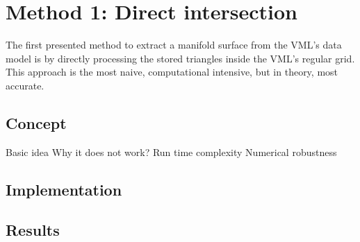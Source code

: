 
\chapter{Method 1: Direct intersection}
\label{ch:direct_intersection}

The first presented method to extract a manifold surface from the VML's data model is by directly processing the stored triangles inside the VML's regular grid.
This approach is the most naive, computational intensive, but in theory, most accurate.

\section{Concept}
\label{sec:direct_intersection_concept}



Basic idea
Why it does not work?
Run time complexity
Numerical robustness



\section{Implementation}
\label{sec:direct_intersection_implementation}




\section{Results}
\label{sec:direct_intersection_results}

